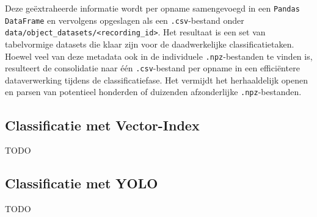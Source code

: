 Deze geëxtraheerde informatie wordt per opname samengevoegd in een \texttt{Pandas DataFrame} en vervolgens opgeslagen 
als een \texttt{.csv}-bestand onder \texttt{data/object\_datasets/<recording\_id>}. 
Het resultaat is een set van tabelvormige datasets die klaar zijn voor de daadwerkelijke classificatietaken.
Hoewel veel van deze metadata ook in de individuele \texttt{.npz}-bestanden te vinden is, resulteert de consolidatie 
naar één \texttt{.csv}-bestand per opname in een efficiëntere dataverwerking tijdens de classificatiefase. 
Het vermijdt het herhaaldelijk openen en parsen van potentieel honderden of duizenden afzonderlijke \texttt{.npz}-bestanden.

\subsection{Classificatie met Vector-Index}

TODO

\subsection{Classificatie met YOLO}

TODO
